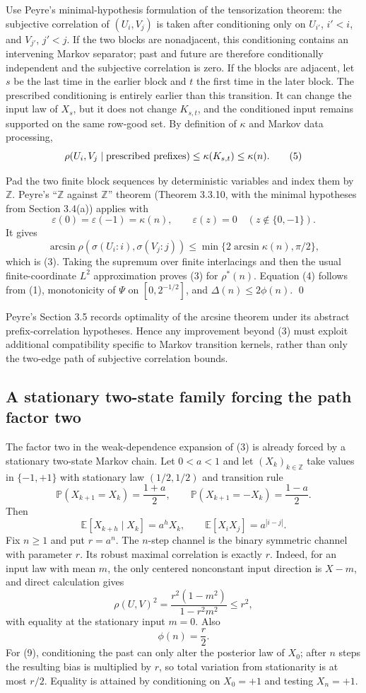Use Peyre's minimal-hypothesis formulation of the tensorization theorem: the
subjective correlation of $(U_i,V_j)$ is taken after conditioning only on
$U_{i'}$, $i'<i$, and $V_{j'}$, $j'<j$.  If the two blocks are nonadjacent,
this conditioning contains an intervening Markov separator; past and future
are therefore conditionally independent and the subjective correlation is
zero.  If the blocks are adjacent, let $s$ be the last time in the earlier
block and $t$ the first time in the later block.  The prescribed conditioning
is entirely earlier than this transition.  It can change the input law of
$X_s$, but it does not change $K_{s,t}$, and the conditioned input remains
supported on the same row-good set.  By definition of $\kappa$ and Markov data
processing,
\[
 \rho(U_i,V_j\mid\hbox{prescribed prefixes})
 \le \kappa(K_{s,t})\le\kappa(n).
\tag{5}
\]

Pad the two finite block sequences by deterministic variables and index them
by $\mathbb Z$.  Peyre's ``$\mathbb Z$ against $\mathbb Z$'' theorem
(Theorem 3.3.10, with the minimal hypotheses from Section 3.4(a)) applies with
\[
 \varepsilon(0)=\varepsilon(-1)=\kappa(n),\qquad
 \varepsilon(z)=0\quad(z\notin\{0,-1\}).
\]
It gives
\[
 \arcsin\rho(\sigma(U_i:i),\sigma(V_j:j))
 \le \min\{2\arcsin\kappa(n),\pi/2\},
\]
which is (3).  Taking the supremum over finite interlacings and then the usual
finite-coordinate $L^2$ approximation proves (3) for $\rho^*(n)$.
Equation (4) follows from (1), monotonicity of $\Psi$ on $[0,2^{-1/2}]$, and
$\Delta(n)\le2\phi(n)$.  \qed

Peyre's Section 3.5 records optimality of the arcsine theorem under its abstract
prefix-correlation hypotheses.  Hence any improvement beyond (3) must exploit
additional compatibility specific to Markov transition kernels, rather than
only the two-edge path of subjective correlation bounds.

\subsection{A stationary two-state family forcing the path factor two}

The factor two in the weak-dependence expansion of (3) is already forced by a
stationary two-state Markov chain.  Let $0<a<1$ and let $(X_k)_{k\in\mathbb Z}$
take values in $\{-1,+1\}$ with stationary law $(1/2,1/2)$ and transition rule
\[
 \mathbb P(X_{k+1}=X_k)=\frac{1+a}{2},\qquad
 \mathbb P(X_{k+1}=-X_k)=\frac{1-a}{2}.
\tag{6}
\]
Then
\[
 \mathbb E[X_{k+h}\mid X_k]=a^hX_k,
 \qquad \mathbb E[X_iX_j]=a^{|i-j|}.
\tag{7}
\]
Fix $n\ge1$ and put $r=a^n$.  The $n$-step channel is the binary symmetric
channel with parameter $r$.  Its robust maximal correlation is exactly $r$.
Indeed, for an input law with mean $m$, the only centered nonconstant input
direction is $X-m$, and direct calculation gives
\[
 \rho(U,V)^2=
 \frac{r^2(1-m^2)}{1-r^2m^2}\le r^2,
\tag{8}
\]
with equality at the stationary input $m=0$.  Also
\[
 \boxed{\phi(n)=\frac r2.}
\tag{9}
\]
For (9), conditioning the past can only alter the posterior law of $X_0$;
after $n$ steps the resulting bias is multiplied by $r$, so total variation
from stationarity is at most $r/2$.  Equality is attained by conditioning on
$X_0=+1$ and testing $X_n=+1$.

